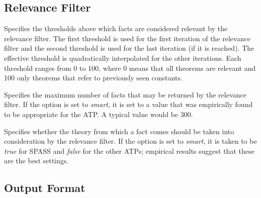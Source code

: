 \documentclass[a4paper,12pt]{article}
\begin{document}
\subsection{Relevance Filter}
\label{relevance-filter}

\begin{enum}
Specifies the thresholds above which facts are considered relevant by the
relevance filter. The first threshold is used for the first iteration of the
relevance filter and the second threshold is used for the last iteration (if it
is reached). The effective threshold is quadratically interpolated for the other
iterations. Each threshold ranges from 0 to 100, where 0 means that all theorems
are relevant and 100 only theorems that refer to previously seen constants.

Specifies the maximum number of facts that may be returned by the relevance
filter. If the option is set to \textit{smart}, it is set to a value that was
empirically found to be appropriate for the ATP. A typical value would be 300.

Specifies whether the theory from which a fact comes should be taken into
consideration by the relevance filter. If the option is set to \textit{smart},
it is taken to be \textit{true} for SPASS and \textit{false} for the other ATPs;
empirical results suggest that these are the best settings.

\end{enum}

\subsection{Output Format}
\label{output-format}
\end{document}
